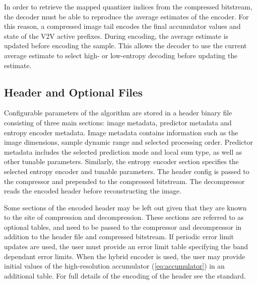 In order to retrieve the mapped quantizer indices from the compressed bitstream, the decoder must be able to reproduce the average estimates of the encoder. For this reason, a compressed image tail encodes the final accumulator values and state of the \acrshort{V2V} active prefixes. During encoding, the average estimate is updated before encoding the sample. This allows the decoder to use the current average estimate to select high- or low-entropy decoding before updating the estimate.

\subsection{Header and Optional Files}

Configurable parameters of the algorithm are stored in a header binary file consisting of three main sections: image metadata, predictor metadata and entropy encoder metadata. Image metadata contains information such as the image dimensions, sample dynamic range and selected processing order. Predictor metadata includes the selected prediction mode and local sum type, as well as other tunable parameters. Similarly, the entropy encoder section specifies the selected entropy encoder and tunable parameters. The header config is passed to the compressor and prepended to the compressed bitstream. The decompressor reads the encoded header before reconstructing the image.

Some sections of the encoded header may be left out given that they are known to the site of compression and decompression. These sections are referred to as optional tables, and need to be passed to the compressor and decompressor in addition to the header file and compressed bitstream. If periodic error limit updates are used, the user must provide an error limit table specifying the band dependant error limits. When the hybrid encoder is used, the user may provide initial values of the high-resolution accumulator (\autoref{eq:accumulator}) in an additional table. For full details of the encoding of the header see the standard.
